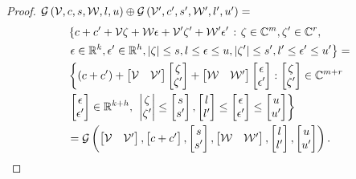\begin{proof}
$\mathcal{G}\left(\mathcal{V},c,s,\mathcal{W},l,u\right)\oplus\mathcal{G}\left(\mathcal{V}^\prime,c^\prime,
    s^\prime,\mathcal{W}^\prime,l^\prime,u^\prime\right)=$
%
\begin{align*}
&  \left\{c+c^\prime+\mathcal{V}\zeta+\mathcal{W}\epsilon+\mathcal{V}^\prime\zeta^\prime+\mathcal{W}^\prime\epsilon^\prime\right.:
  \left. \zeta\in\mathbb{C}^m,\zeta^\prime\in\mathbb{C}^r,\right.\\
  & \left. \epsilon\in\mathbb{R}^k,\epsilon^\prime\in\mathbb{R}^h,
    \left|\zeta\right|\leq s,l\leq\epsilon\leq
    u,\left|\zeta^\prime\right|\leq s^\prime,l^\prime\leq\epsilon^\prime\leq
    u^\prime\right\}=\\
& \left\{\left(c+c^\prime\right)+\left[\begin{matrix}\mathcal{V}
      &\mathcal{V}^\prime\end{matrix}\right]\left[\begin{matrix}\zeta\\\zeta^\prime\end{matrix}\right]+\left[\begin{matrix}\mathcal{W}
      &\mathcal{W}^\prime\end{matrix}\right]\left[\begin{matrix}\epsilon\\ \epsilon^\prime\end{matrix}\right]: \left[\begin{matrix}\zeta\\\zeta^\prime\end{matrix}\right]\in\mathbb{C}^{m+r}\right.\\
    & \left. \left[\begin{matrix}\epsilon\\\epsilon^\prime\end{matrix}\right]\in\mathbb{R}^{k+h},\right.
    \left.\left|\begin{matrix}\zeta\\\zeta^\prime\end{matrix}\right|\leq
        \left[\begin{matrix}s\\s^\prime\end{matrix}\right],
        \left[\begin{matrix}l\\l^\prime\end{matrix}\right]\leq\left[\begin{matrix}\epsilon\\\epsilon^\prime\end{matrix}\right]\leq\left[\begin{matrix}u\\u^\prime\end{matrix}\right]
        \right\}\\
& = \mathcal{G}\left(
    \left[\begin{matrix}\mathcal{V} & \mathcal{V}^\prime\end{matrix}\right]
  ,
            \left[\begin{matrix}c+c^\prime\end{matrix}\right]
          ,\left[\begin{matrix}s\\s^\prime\end{matrix}\right]
          ,\left[\begin{matrix}\mathcal{W} & \mathcal{W}^\prime\end{matrix}\right]
          ,\left[\begin{matrix}l\\ l^\prime\end{matrix}\right]
          ,\left[\begin{matrix}u\\ u^\prime\end{matrix}\right]
          \right).\hspace{1em}\qedhere
\end{align*}
%
\end{proof}
%
